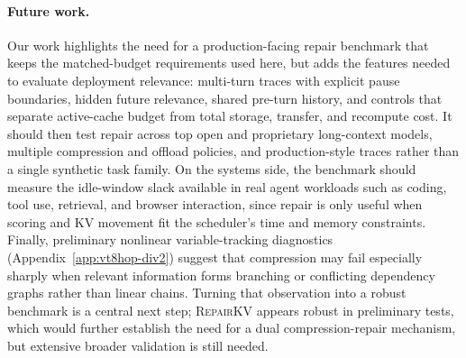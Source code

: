 \documentclass{article}
\newcommand{\repairkv}{\textsc{RepairKV}}
\begin{document}
\paragraph{Future work.}
Our work highlights the need for a production-facing repair
benchmark that keeps the matched-budget requirements used here, but adds the
features needed to evaluate deployment relevance: multi-turn traces with
explicit pause boundaries, hidden future relevance, shared pre-turn history,
and controls that separate active-cache budget from total storage, transfer,
and recompute cost. It should then test repair across top open and proprietary
long-context models, multiple compression and offload policies, and
production-style traces rather than a single synthetic task family. On the
systems side, the benchmark should measure the idle-window slack available in
real agent workloads such as coding, tool use, retrieval, and browser
interaction, since repair is only useful when scoring and KV movement fit the
scheduler's time and memory constraints. Finally, preliminary nonlinear
variable-tracking diagnostics (Appendix~\ref{app:vt8hop-div2}) suggest that
compression may fail especially sharply when relevant information forms
branching or conflicting dependency graphs rather than linear chains. Turning
that observation into a robust benchmark is a central next step; \repairkv{}
appears robust in preliminary tests, which would further establish the need for a dual compression-repair mechanism, but extensive broader validation is still needed.

\FloatBarrier
\end{document}
